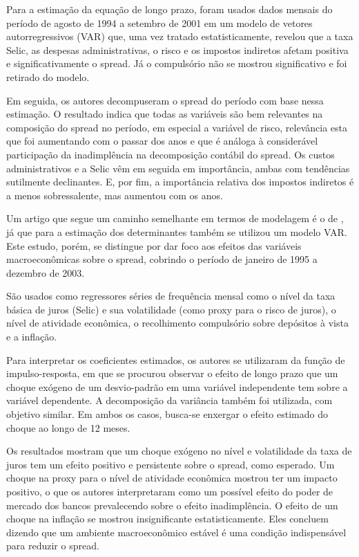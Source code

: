 \documentclass[a4paper,
               article,
               12pt,
               openany,
               oneside,
               english,
               brazil]{abntex2}
\numberwithin{equation}{section}
\begin{document}
    Para a estimação da equação de longo prazo, foram usados dados mensais do período de agosto de 1994 a setembro de 2001 em um modelo de vetores autorregressivos (VAR) que, uma vez tratado estatisticamente, revelou que a taxa Selic, as despesas administrativas, o risco e os impostos indiretos afetam positiva e significativamente o spread. Já o compulsório não se mostrou significativo e foi retirado do modelo.

    Em seguida, os autores decompuseram o spread do período com base nessa estimação. O resultado indica que todas as variáveis são bem relevantes na composição do spread no período, em especial a variável de risco, relevância esta que foi aumentando com o passar dos anos e que é análoga à considerável participação da inadimplência na decomposição contábil do spread. Os custos administrativos e a Selic vêm em seguida em importância, ambas com tendências sutilmente declinantes. E, por fim, a importância relativa dos impostos indiretos é a menos sobressalente, mas aumentou com os anos. 

    Um artigo que segue um caminho semelhante em termos de modelagem é o de \textcite{oreiro}, já que para a estimação dos determinantes também se utilizou um modelo VAR\@. Este estudo, porém, se distingue por dar foco aos efeitos das variáveis macroeconômicas sobre o spread, cobrindo o período de janeiro de 1995 a dezembro de 2003. 
    
    São usados como regressores séries de frequência mensal como o nível da taxa básica de juros (Selic) e sua volatilidade (como proxy para o risco de juros), o nível de atividade econômica, o recolhimento compulsório sobre depósitos à vista e a inflação.

    Para interpretar os coeficientes estimados, os autores se utilizaram da função de impulso-resposta, em que se procurou observar o efeito de longo prazo que um choque exógeno de um desvio-padrão em uma variável independente tem sobre a variável dependente. A decomposição da variância também foi utilizada, com objetivo similar. Em ambos os casos, busca-se enxergar o efeito estimado do choque ao longo de 12 meses.

    Os resultados mostram que um choque exógeno no nível e volatilidade da taxa de juros tem um efeito positivo e persistente sobre o spread, como esperado. Um choque na proxy para o nível de atividade econômica mostrou ter um impacto positivo, o que os autores interpretaram como um possível efeito do poder de mercado dos bancos prevalecendo sobre o efeito inadimplência. O efeito de um choque na inflação se mostrou insignificante estatisticamente. Eles concluem dizendo que um ambiente macroeconômico estável é uma condição indispensável para reduzir o spread.
\end{document}
